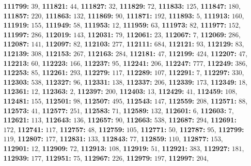 \textsf{\bfseries 111799:} $39$, \textsf{\bfseries 111821:} $44$, \textsf{\bfseries 111827:} $32$, \textsf{\bfseries 111829:} $72$, \textsf{\bfseries 111833:} $125$, \textsf{\bfseries 111847:} $180$, \textsf{\bfseries 111857:} $220$, \textsf{\bfseries 111863:} $132$, \textsf{\bfseries 111869:} $90$, \textsf{\bfseries 111871:} $192$, \textsf{\bfseries 111893:} $5$, \textsf{\bfseries 111913:} $160$, \textsf{\bfseries 111919:} $155$, \textsf{\bfseries 111949:} $58$, \textsf{\bfseries 111953:} $12$, \textsf{\bfseries 111959:} $63$, \textsf{\bfseries 111973:} $82$, \textsf{\bfseries 111977:} $152$, \textsf{\bfseries 111997:} $286$, \textsf{\bfseries 112019:} $143$, \textsf{\bfseries 112031:} $79$, \textsf{\bfseries 112061:} $23$, \textsf{\bfseries 112067:} $7$, \textsf{\bfseries 112069:} $286$, \textsf{\bfseries 112087:} $141$, \textsf{\bfseries 112097:} $82$, \textsf{\bfseries 112103:} $277$, \textsf{\bfseries 112111:} $684$, \textsf{\bfseries 112121:} $93$, \textsf{\bfseries 112129:} $83$, \textsf{\bfseries 112139:} $308$, \textsf{\bfseries 112153:} $267$, \textsf{\bfseries 112163:} $284$, \textsf{\bfseries 112181:} $47$, \textsf{\bfseries 112199:} $424$, \textsf{\bfseries 112207:} $47$, \textsf{\bfseries 112213:} $60$, \textsf{\bfseries 112223:} $166$, \textsf{\bfseries 112237:} $95$, \textsf{\bfseries 112241:} $206$, \textsf{\bfseries 112247:} $777$, \textsf{\bfseries 112249:} $386$, \textsf{\bfseries 112253:} $85$, \textsf{\bfseries 112261:} $293$, \textsf{\bfseries 112279:} $117$, \textsf{\bfseries 112289:} $107$, \textsf{\bfseries 112291:} $7$, \textsf{\bfseries 112297:} $330$, \textsf{\bfseries 112303:} $538$, \textsf{\bfseries 112327:} $96$, \textsf{\bfseries 112331:} $138$, \textsf{\bfseries 112337:} $206$, \textsf{\bfseries 112339:} $173$, \textsf{\bfseries 112349:} $18$, \textsf{\bfseries 112361:} $12$, \textsf{\bfseries 112363:} $2$, \textsf{\bfseries 112397:} $200$, \textsf{\bfseries 112403:} $13$, \textsf{\bfseries 112429:} $41$, \textsf{\bfseries 112459:} $108$, \textsf{\bfseries 112481:} $155$, \textsf{\bfseries 112501:} $98$, \textsf{\bfseries 112507:} $495$, \textsf{\bfseries 112543:} $147$, \textsf{\bfseries 112559:} $208$, \textsf{\bfseries 112571:} $88$, \textsf{\bfseries 112573:} $41$, \textsf{\bfseries 112577:} $251$, \textsf{\bfseries 112583:} $71$, \textsf{\bfseries 112589:} $132$, \textsf{\bfseries 112601:} $6$, \textsf{\bfseries 112603:} $7$, \textsf{\bfseries 112621:} $113$, \textsf{\bfseries 112643:} $136$, \textsf{\bfseries 112657:} $90$, \textsf{\bfseries 112663:} $538$, \textsf{\bfseries 112687:} $294$, \textsf{\bfseries 112691:} $172$, \textsf{\bfseries 112741:} $117$, \textsf{\bfseries 112757:} $48$, \textsf{\bfseries 112759:} $105$, \textsf{\bfseries 112771:} $50$, \textsf{\bfseries 112787:} $95$, \textsf{\bfseries 112799:} $119$, \textsf{\bfseries 112807:} $177$, \textsf{\bfseries 112831:} $133$, \textsf{\bfseries 112843:} $77$, \textsf{\bfseries 112859:} $110$, \textsf{\bfseries 112877:} $153$, \textsf{\bfseries 112901:} $12$, \textsf{\bfseries 112909:} $72$, \textsf{\bfseries 112913:} $108$, \textsf{\bfseries 112919:} $51$, \textsf{\bfseries 112921:} $383$, \textsf{\bfseries 112927:} $181$, \textsf{\bfseries 112939:} $177$, \textsf{\bfseries 112951:} $75$, \textsf{\bfseries 112967:} $226$, \textsf{\bfseries 112979:} $197$, \textsf{\bfseries 112997:} $204$, 
